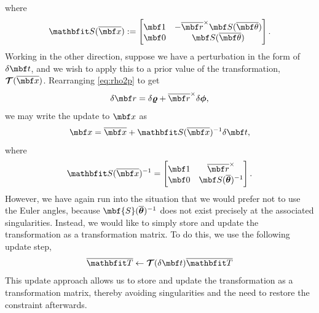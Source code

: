 \documentclass[11pt,a4,oneside]{article}
\begin{document}
where
\begin{equation}
  \label{eq:T-S-matrix}
  \mbfh S(\mbfbar x) := \bbm \mbf 1 & - \mbfbar r^\times \mbf S(\mbfbar \theta) \\
                            \mbf 0 & \mbf S(\mbfbar \theta)
                       \ebm.
\end{equation}
Working in the other direction, suppose we have a perturbation in the form of $\mbfdel t$, 
and we wish to apply this to a prior value of the transformation, $\mbc T(\mbfbar x)$.  Rearranging \eqref{eq:rho2p} to get
\begin{equation}
  \mbfdel r = \mbsdel \varrho + \mbfbar r^\times \mbsdel \phi,
\end{equation}
we may write the update to $\mbf x$ as
\begin{equation}
\label{eq:tx-eulerangleupdate}
\mbf x = \mbfbar x + \mbfh S(\mbfbar x)^{-1}\mbfdel t,
\end{equation}
where
\begin{equation}
  \label{eq:T-invS}
  \mbfh S(\mbfbar x)^{-1} =  \bbm
                                \mbf 1 & \mbfbar r^\times \\
                                \mbf 0 & \mbf S(\mbsbar \theta)^{-1}
                             \ebm.
\end{equation}
However, we have again run into the situation that we would prefer not to use the Euler angles, because $\mbf{S}(\mbsbar \theta)^{-1}$ does not exist precisely at the associated singularities.  Instead, we would like to simply store and update the transformation as a transformation matrix.  To do this, we use the following update step,
\begin{equation}
\label{eq:update-transformation}
  \mbfhbar T  \leftarrow \mbc T(\mbfdel t) \mbfhbar T
\end{equation}
This update approach allows us to store and update the transformation as a transformation matrix, thereby avoiding singularities and the need to restore the constraint afterwards.
\end{document}
